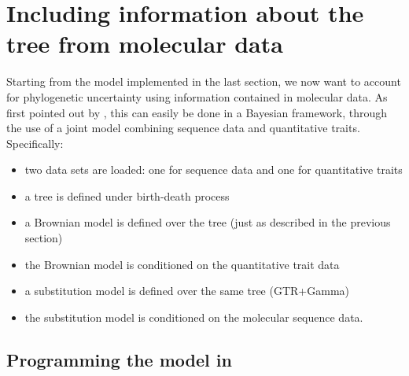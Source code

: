 \vspace{5cm}







\section{Including information about the tree from molecular data}

Starting from the model implemented in the last section, we now want to account for phylogenetic uncertainty using information contained in molecular data. As first pointed out by \cite{Huelsenbeck2003}, this can easily be done in a Bayesian framework, through the use of a joint model combining sequence data and quantitative traits. Specifically:
\begin{itemize}
\item
two data sets are loaded: one for sequence data and one for quantitative traits
\item
a tree is defined under birth-death process
\item
a Brownian model is defined over the tree (just as described in the previous section)
\item
the Brownian model is conditioned on the quantitative trait data
\item
a substitution model is defined over the same tree (GTR+Gamma)
\item
the substitution model is conditioned on the molecular sequence data.
\end{itemize}

\subsection{Programming the model in \RevBayes}

